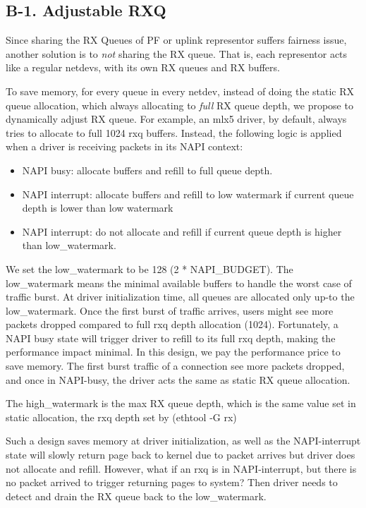 \documentclass[letterpaper]{article}
\begin{document}
\subsection{B-1. Adjustable RXQ}
Since sharing the RX Queues of PF or uplink representor suffers fairness
issue, another solution is to {\em not} sharing the RX queue. That is, each
representor acts like a regular netdevs, with its own RX queues and RX buffers.

To save memory, for every queue in every netdev, instead of doing the
static RX queue allocation, which always allocating to \emph{full} RX queue
depth, we propose to dynamically adjust RX queue.
For example, an mlx5 driver, by default, always tries to allocate to
full 1024 rxq buffers. Instead, the following logic is applied when
a driver is receiving packets in its NAPI context:
\begin{itemize}
    \item NAPI busy: allocate buffers and refill to full queue depth.
    \item NAPI interrupt: allocate buffers and refill to low watermark if
    current queue depth is lower than low watermark
    \item NAPI interrupt: do not allocate and refill if current queue
    depth is higher than low\_watermark.
\end{itemize}

We set the low\_watermark to be 128 (2 * NAPI\_BUDGET). 
The low\_watermark means the minimal available buffers to handle the
worst case of traffic burst. At driver initialization time, all queues
are allocated only up-to the low\_watermark. Once the first burst
of traffic arrives, users might see more packets dropped compared
to full rxq depth allocation (1024). Fortunately, a NAPI busy state will
trigger driver to refill to its full rxq depth, making the performance
impact minimal. In this design, we pay the performance price to save
memory. The first burst traffic of a connection see more packets dropped,
and once in NAPI-busy, the driver acts the same as static RX queue
allocation.

The high\_watermark is the max RX queue depth, which is the same value
set in static allocation, the rxq depth set by (ethtool -G rx)

Such a design saves memory at driver initialization, as well as the
NAPI-interrupt
state will slowly return page back to kernel due to packet arrives but
driver does not allocate and refill. However, what if an rxq is in
NAPI-interrupt, but there is no packet arrived to trigger returning
pages to system? Then driver needs to detect and drain the RX queue
back to the low\_watermark.
\end{document}
